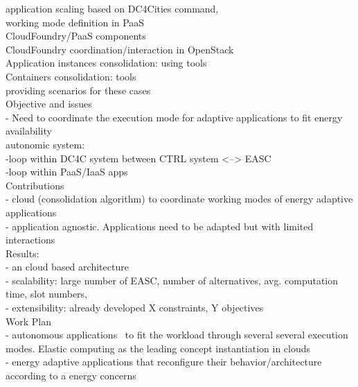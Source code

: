 application scaling based on DC4Cities command, \\
working mode definition in PaaS \\

CloudFoundry/PaaS components \\

CloudFoundry coordination/interaction in OpenStack \\
Application instances consolidation: using tools \\
Containers consolidation: tools \\


providing scenarios for these cases \\
Objective and issues \\
- Need to coordinate the execution mode for adaptive applications to fit energy availability \\
autonomic system: \\
-loop within DC4C system between CTRL system <--> EASC \\
-loop within PaaS/IaaS apps \\
		
Contributions \\
- cloud (consolidation algorithm) to coordinate working modes of energy adaptive applications \\
- application agnostic. Applications need to be adapted but with limited interactions \\
	
Results: \\
- an cloud based architecture \\
- scalability:  large number of EASC, number of alternatives, avg. computation time, slot numbers,  \\
- extensibility: already developed X constraints, Y objectives \\
 
Work Plan \\

- autonomous applications~\cite{kephart-computer2003} to fit the workload through several several execution modes. Elastic computing as the leading concept instantiation in clouds~\cite{x} \\
- energy adaptive applications that reconfigure their behavior/architecture  according to a energy concerns~\cite{energy-adaptive-apps-OSR12, others} \\


